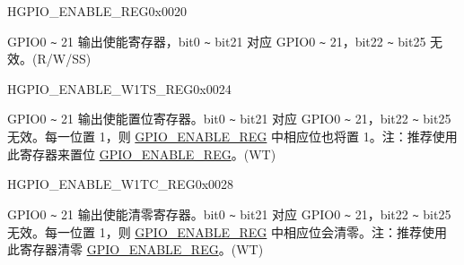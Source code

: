 \begin{register}{H}{GPIO\_ENABLE\_REG}{0x0020}\label{regdesc:GPIOENABLEREG}
%
%
\regnewline%
\begin{regdesc}\begin{reglist}
\label{fielddesc:GPIOENABLEDATA}\item [GPIO\_ENABLE\_DATA] GPIO0 \verb+~+ 21 输出使能寄存器，bit0 \verb+~+ bit21 对应 GPIO0 \verb+~+ 21，bit22 \verb+~+ bit25 无效。(R/W/SS)
\end{reglist}\end{regdesc}
\end{register}


\begin{register}{H}{GPIO\_ENABLE\_W1TS\_REG}{0x0024}\label{regdesc:GPIOENABLEW1TSREG}
%
%
\regnewline%
\begin{regdesc}\begin{reglist}
\label{fielddesc:GPIOENABLEW1TS}\item [GPIO\_ENABLE\_W1TS] GPIO0 \verb+~+ 21 输出使能置位寄存器。bit0 \verb+~+ bit21 对应 GPIO0 \verb+~+ 21，bit22 \verb+~+ bit25 无效。每一位置 1，则 \hyperref[regdesc:GPIOENABLEREG]{GPIO\_ENABLE\_REG} 中相应位也将置 1。注：推荐使用此寄存器来置位 \hyperref[regdesc:GPIOENABLEREG]{GPIO\_ENABLE\_REG}。(WT)
\end{reglist}\end{regdesc}
\end{register}


\begin{register}{H}{GPIO\_ENABLE\_W1TC\_REG}{0x0028}\label{regdesc:GPIOENABLEW1TCREG}
%
%
\regnewline%
\begin{regdesc}\begin{reglist}
\label{fielddesc:GPIOENABLEW1TC}\item [GPIO\_ENABLE\_W1TC] GPIO0 \verb+~+ 21 输出使能清零寄存器。bit0 \verb+~+ bit21 对应 GPIO0 \verb+~+ 21，bit22 \verb+~+ bit25 无效。每一位置 1，则 \hyperref[regdesc:GPIOENABLEREG]{GPIO\_ENABLE\_REG} 中相应位会清零。注：推荐使用此寄存器清零 \hyperref[regdesc:GPIOENABLEREG]{GPIO\_ENABLE\_REG}。(WT)
\end{reglist}\end{regdesc}
\end{register}


